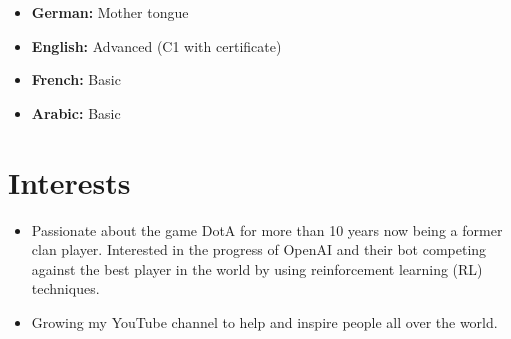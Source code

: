 \documentclass[11pt,a4paper,sans]{moderncv}        %
\begin{document}
\begin{itemize}

\setlength\itemsep{1em}

\item \textbf{German:} Mother tongue

\item \textbf{English:}  Advanced (C1 with certificate)

\item \textbf{French:}  Basic

\item \textbf{Arabic:}  Basic


\end{itemize}

\section{Interests}

\vspace{6pt}

\begin{itemize}

\item{Passionate about the game DotA for more than 10 years now being a former clan player. Interested in the progress of OpenAI and their bot competing against the best player in the world by using reinforcement learning (RL) techniques.}

\vspace{6pt}

\item{Growing my YouTube channel to help and inspire people all over the world.}

\end{itemize}

\nocite{*}



\end{document}
